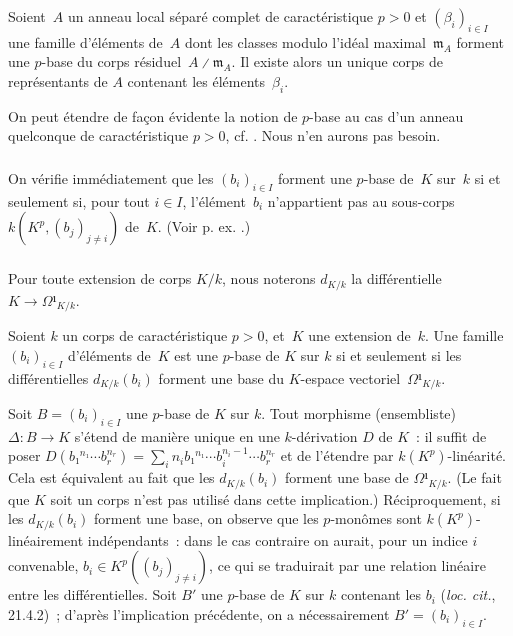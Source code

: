 \documentclass[10pt]{../fichiers-configuration-latex/smfart}
\begin{document}
\begin{theoreme2}[\ac{v}{3}{3}{, th. 1 b)}]
Soient $A$ un anneau local séparé complet de caractéristique $p>0$
et $(β_i)_{i∈I}$ une famille d'éléments de $A$ dont les classes modulo
l'idéal maximal $𝔪 _A$ forment une $p$-base du corps résiduel $A ∕ 𝔪_A$.  Il existe
alors un unique corps de représentants de $A$ contenant les éléments $β_i$.
\end{theoreme2}

\begin{remarque2}
On peut étendre de façon évidente la notion de $p$-base
au cas d'un anneau quelconque de caractéristique $p>0$,
cf. . Nous n'en aurons pas besoin.
\end{remarque2}

\subsubsection{}On vérifie immédiatement que les $(b_i)_{i∈I}$
forment une $p$-base de $K$ sur $k$ si et seulement si, pour tout $i∈I$,
l'élément $b_i$ n'appartient pas au sous-corps $k(K^p,(b_j)_{j≠i})$
de $K$. 
(Voir p. ex. .)

\subsubsection{}Pour toute extension de corps $K/k$, nous noterons $d_{K/k}$ la différentielle $K→ Ω¹_{K/k}$.

\begin{proposition2}
\label{4-caractérisation différentielle}
Soient $k$ un corps de caractéristique $p>0$, et $K$ une extension de $k$.
Une famille $(b_i)_{i∈I}$ d'éléments de $K$
est une $p$-base de $K$ sur $k$ si et seulement si les différentielles
$d_{K/k}(b_i)$ forment une base du $K$-espace vectoriel $Ω¹_{K/k}$.
\end{proposition2}

\begin{démo}
Soit $B=(b_i)_{i∈I}$ une $p$-base de $K$ sur $k$. Tout morphisme
(ensembliste) $Δ:B→K$ s'étend de manière unique en une $k$-dérivation
$D$ de $K$ : il suffit de poser $D(b₁^{n₁}\cdots b_r^{n_r})= ∑_i n_i
b₁^{n₁}\cdots b_i^{n_i-1}\cdots b_r^{n_r}$ et de 
l'étendre par $k(K^p)$-linéarité. Cela est équivalent au fait que les $d_{K/k}(b_i)$
forment une base de $Ω¹_{K/k}$. (Le fait que $K$ soit un corps
n'est pas utilisé dans cette implication.) Réciproquement, si les $d_{K/k}(b_i)$ forment une base, on 
observe que les $p$-monômes sont $k(K^p)$-linéairement indépendants : 
dans le cas contraire on aurait, pour un indice $i$ convenable,
$b_i∈K^p((b_j)_{j≠i})$, ce qui se traduirait par une relation
linéaire entre les différentielles. Soit $B'$ une $p$-base de $K$ sur $k$ contenant les
$b_i$ (\emph{loc. cit.}, 21.4.2) ; d'après l'implication précédente, on a nécessairement
$B'=(b_i)_{i∈I}$.
\end{démo}
\end{document}

